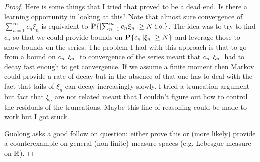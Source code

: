 \documentclass{amsart}
\theoremstyle{remark}
\theoremstyle{definition}
\begin{document}
\begin{proof}
Here is some things that I tried that proved to be a dead end.  Is there
a learning opportunity in looking at this?  Note that almost sure
convergence of $\sum_{n=1}^\infty c_n \xi_n$ is equivalent to
$\textbf{P}\{\left \vert \sum_{n=1}^\infty c_n \xi_n \right \vert \geq N \text{
    i.o.}\}$.  The idea was to try to find $c_n$ so that we could
provide bounds on $\textbf{P}\{c_n\left \vert \xi_n \right \vert \geq N\}$ and leverage
those to show bounds on the series.  The problem I had with this
approach is that to go from a bound on $c_n\left \vert \xi_n \right \vert$ to convergence
of the series meant that $c_n\left \vert \xi_n \right \vert$ had to decay fast enough to
get convergence.  If we assume a finite moment then Markov could
provide a rate of decay but in the absence of that one has to deal
with the fact that tails of $\xi_n$ can decay increasingly slowly.
I tried a truncation argument but fact that $\xi_n$ are not related
meant that I couldn't figure out how to control the residuals of the
truncations.  Maybe this line of reasoning could be made to work but I
got stuck.

Guolong asks a good follow on question: either prove this or (more
likely) provide a
counterexample on general (non-finite) measure spaces (e.g. Lebesgue measure on $\mathbb{R}$).
\end{proof}
\end{document}
